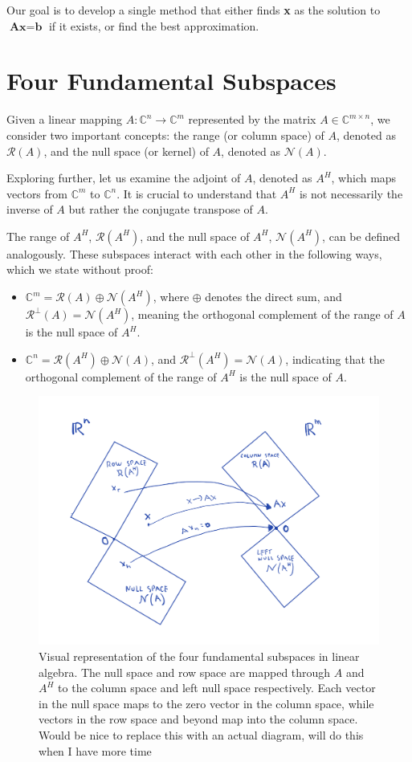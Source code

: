 Our goal is to develop a single method that either finds \textbf{x} as the solution to $\textbf{Ax}=\textbf{b}$ if it exists, or find the best approximation.
\section{Four Fundamental Subspaces}
Given a linear mapping $A: \mathbb{C}^n \rightarrow \mathbb{C}^m$ represented by the matrix $A \in \mathbb{C}^{m \times n}$, we consider two important concepts: the range (or column space) of $A$, denoted as $\mathcal{R}(A)$, and the null space (or kernel) of $A$, denoted as $\mathcal{N}(A)$.

Exploring further, let us examine the adjoint of $A$, denoted as $A^H$, which maps vectors from $\mathbb{C}^m$ to $\mathbb{C}^n$. It is crucial to understand that $A^H$ is not necessarily the inverse of $A$ but rather the conjugate transpose of $A$.

The range of $A^H$, $\mathcal{R}(A^H)$, and the null space of $A^H$, $\mathcal{N}(A^H)$, can be defined analogously. These subspaces interact with each other in the following ways, which we state without proof:

\begin{itemize}
  \item $\mathbb{C}^m = \mathcal{R}(A) \oplus \mathcal{N}(A^H)$, where $\oplus$ denotes the direct sum, and $\mathcal{R}^\perp(A) = \mathcal{N}(A^H)$, meaning the orthogonal complement of the range of $A$ is the null space of $A^H$.
  \item $\mathbb{C}^n = \mathcal{R}(A^H) \oplus \mathcal{N}(A)$, and $\mathcal{R}^\perp(A^H) = \mathcal{N}(A)$, indicating that the orthogonal complement of the range of $A^H$ is the null space of $A$.
\end{itemize}


\begin{figure}[H]
    \centering
    \includegraphics[width=0.75\linewidth]{img/subspaces.png}
    \caption{Visual representation of the four fundamental subspaces in linear algebra. The null space and row space are mapped through $A$ and $A^H$ to the column space and left null space respectively. Each vector in the null space maps to the zero vector in the column space, while vectors in the row space and beyond map into the column space. Would be nice to replace this with an actual diagram, will do this when I have more time}
\end{figure}

